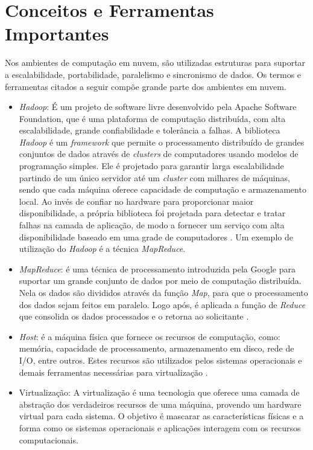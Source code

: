 \section{Conceitos e Ferramentas Importantes}

Nos ambientes de computação em nuvem, são utilizadas estruturas para suportar a escalabilidade, portabilidade, paralelismo e sincronismo de dados. Os termos e ferramentas citados a seguir compõe grande parte dos ambientes em nuvem. 

\begin{itemize}
  \item \textit{Hadoop}: É um projeto de software livre desenvolvido pela Apache Software Foundation, que é uma plataforma de computação distribuída, com alta escalabilidade, grande confiabilidade e tolerância a falhas.
  A biblioteca \textit{Hadoop} é um \textit{framework} que permite o processamento distribuído de grandes conjuntos de dados através de \textit{clusters} de computadores usando modelos de programação simples. Ele é projetado para garantir larga escalabilidade partindo de um único servidor até um \textit{cluster} com milhares de máquinas, sendo que cada máquina oferece capacidade de computação e armazenamento local. Ao invés de confiar no hardware para proporcionar maior disponibilidade, a própria biblioteca foi projetada para detectar e tratar falhas na camada de aplicação, de modo a fornecer um serviço com alta disponibilidade baseado em uma grade de computadores \cite{hadoop}. Um exemplo de utilização do \textit{Hadoop} é a técnica \textit{MapReduce}.
    \item \textit{MapReduce}: é uma técnica de processamento introduzida pela Google para suportar um grande conjunto de dados por meio de computação distribuída. Nela os dados são divididos através da função \textit{Map}, para que o processamento dos dados sejam feitos em paralelo. Logo após, é aplicada a função de \textit{Reduce} que consolida os dados processados e o retorna ao solicitante \cite{mapreduce}.
  \item \textit{Host}: é a máquina física que fornece os recursos de computação, como: memória, capacidade de processamento, armazenamento em disco, rede de I/O, entre outros. Estes recursos são utilizados pelos sistemas operacionais e demais ferramentas necessárias para virtualização \cite{Technology}.
  \item Virtualização: A virtualização é uma tecnologia que oferece uma camada de abstração dos verdadeiros recursos de uma máquina, provendo um hardware virtual para cada sistema. O objetivo é mascarar as características físicas e a forma como os sistemas operacionais e aplicações interagem com os recursos computacionais.
  

\end{itemize}
